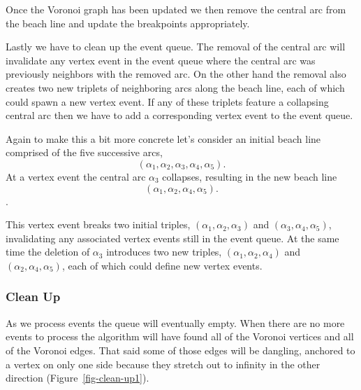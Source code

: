 \documentclass[
  letterpaper,
  DIV=11,
  numbers=noendperiod]{scrartcl}
\begin{document}
Once the Voronoi graph has been updated we then remove the central arc
from the beach line and update the breakpoints appropriately.

Lastly we have to clean up the event queue. The removal of the central
arc will invalidate any vertex event in the event queue where the
central arc was previously neighbors with the removed arc. On the other
hand the removal also creates two new triplets of neighboring arcs along
the beach line, each of which could spawn a new vertex event. If any of
these triplets feature a collapsing central arc then we have to add a
corresponding vertex event to the event queue.

Again to make this a bit more concrete let's consider an initial beach
line comprised of the five successive arcs, \[
( \alpha_{1}, \alpha_{2}, \alpha_{3}, \alpha_{4}, \alpha_{5}).
\] At a vertex event the central arc \(\alpha_{3}\) collapses, resulting
in the new beach line \[
( \alpha_{1}, \alpha_{2}, \alpha_{4}, \alpha_{5}).
\].

This vertex event breaks two initial triples,
\(( \alpha_{1}, \alpha_{2}, \alpha_{3} )\) and
\(( \alpha_{3}, \alpha_{4}, \alpha_{5} )\), invalidating any associated
vertex events still in the event queue. At the same time the deletion of
\(\alpha_{3}\) introduces two new triples,
\(( \alpha_{1}, \alpha_{2}, \alpha_{4} )\) and
\(( \alpha_{2}, \alpha_{4}, \alpha_{5} )\), each of which could define
new vertex events.

\subsubsection{Clean Up}\label{clean-up}

As we process events the queue will eventually empty. When there are no
more events to process the algorithm will have found all of the Voronoi
vertices and all of the Voronoi edges. That said some of those edges
will be dangling, anchored to a vertex on only one side because they
stretch out to infinity in the other direction
(Figure~\ref{fig-clean-up1}).
\end{document}
